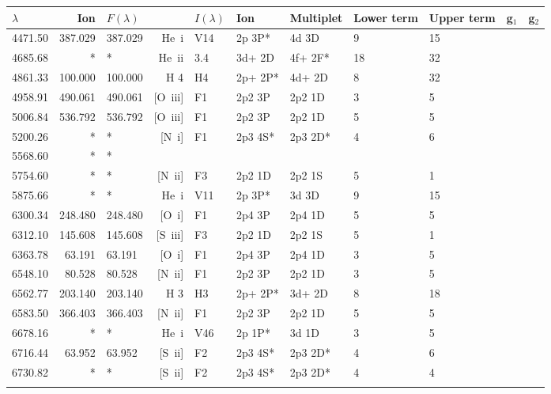  \begin{longtable}{lrlrlllllll}
 \hline
 $ \lambda $ & Ion & $F \left( \lambda \right) $ && $I \left( \lambda \right) $ & Ion & Multiplet & Lower term & Upper term & g$_1$ & g$_2$ \\
 \hline
 4471.50 & 387.029 & 387.029 &  He~{\sc i}      &  V14       &  2p 3P*    &  4d 3D     &          9 &       15    \\
 4685.68 & *       & *       &  He~{\sc ii}     &  3.4       &  3d+ 2D    &  4f+ 2F*   &         18 &       32    \\
 4861.33 & 100.000 & 100.000 &  H 4       &  H4        &  2p+ 2P*   &  4d+ 2D    &          8 &       32          \\
 4958.91 & 490.061 & 490.061 &  [O~{\sc iii}]   &  F1        &  2p2 3P    &  2p2 1D    &          3 &        5    \\
 5006.84 & 536.792 & 536.792 &  [O~{\sc iii}]   &  F1        &  2p2 3P    &  2p2 1D    &          5 &        5    \\
 5200.26 & *       & *       &  [N~{\sc i}]     &  F1        &  2p3 4S*   &  2p3 2D*   &          4 &        6    \\
 5568.60 & *       & *                                                                                            \\
 5754.60 & *       & *       &  [N~{\sc ii}]    &  F3        &  2p2 1D    &  2p2 1S    &          5 &        1    \\
 5875.66 & *       & *       &  He~{\sc i}      &  V11       &  2p 3P*    &  3d 3D     &          9 &       15    \\
 6300.34 & 248.480 & 248.480 &  [O~{\sc i}]     &  F1        &  2p4 3P    &  2p4 1D    &          5 &        5    \\
 6312.10 & 145.608 & 145.608 &  [S~{\sc iii}]   &  F3        &  2p2 1D    &  2p2 1S    &          5 &        1    \\
 6363.78 &  63.191 &  63.191 &  [O~{\sc i}]     &  F1        &  2p4 3P    &  2p4 1D    &          3 &        5    \\
 6548.10 &  80.528 &  80.528 &  [N~{\sc ii}]    &  F1        &  2p2 3P    &  2p2 1D    &          3 &        5    \\
 6562.77 & 203.140 & 203.140 &  H 3       &  H3        &  2p+ 2P*   &  3d+ 2D    &          8 &       18          \\
 6583.50 & 366.403 & 366.403 &  [N~{\sc ii}]    &  F1        &  2p2 3P    &  2p2 1D    &          5 &        5    \\
 6678.16 & *       & *       &  He~{\sc i}      &  V46       &  2p 1P*    &  3d 1D     &          3 &        5    \\
 6716.44 &  63.952 &  63.952 &  [S~{\sc ii}]    &  F2        &  2p3 4S*   &  2p3 2D*   &          4 &        6    \\
 6730.82 & *       & *       &  [S~{\sc ii}]    &  F2        &  2p3 4S*   &  2p3 2D*   &          4 &        4    \\
 \hline
 \label{tab:/home/hmonteiro/Dropbox/work/devel/Neat_2d/neat-1.7/mz1/temp.out_linelist}
 \end{longtable}
